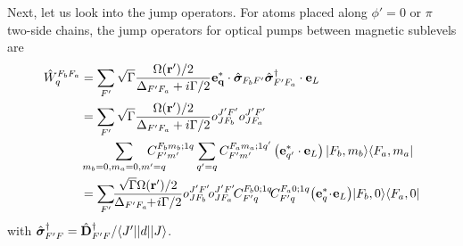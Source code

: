Next, let us look into the jump operators.
For atoms placed along $ \phi'=0 $ or $ \pi $ two-side chains, the jump operators for optical pumps between magnetic sublevels are \cite{Deutsch2010a}
\begin{align} \label{Eq::JumpOperators}
\hat{W}_q^{F_bF_a} &= \sum_{F'} \sqrt{\Gamma}\frac{\Omega(\mathbf{r}')/2}{ \Delta_{F'F_a} + i\Gamma/2} \mathbf{e^*_q} \cdot \hat{\boldsymbol{\sigma}}_{F_bF'} \hat{\boldsymbol{\sigma}}_{F'F_a}^{\dagger} \cdot \mathbf{e}_L \\
&= \sum_{F'} \sqrt{\Gamma}\frac{\Omega(\mathbf{r}')/2}{ \Delta_{F'F_a} + i\Gamma/2} o^{J'F'}_{JF_b} o^{J'F'}_{JF_a}\nonumber\\
& \sum_{m_b=0,m_a=0,m'=q}\!\!\!\!\!\!\!\!\!\! C^{F_b m_b;1q}_{F' m'} \sum_{q'=q}C^{F_a m_a;1q'}_{F' m'} \left(\mathbf{e}^*_{q'} \cdot\mathbf{e}_L \right) \op{F_b,m_b}{F_a,m_a}\\
&= \sum_{F'} \!\!\frac{\sqrt{\Gamma}\Omega(\mathbf{r}')/2}{ \Delta_{F'F_a} \!\!+\! i\Gamma/2} o^{J'F'}_{JF_b}\! o^{J'F'}_{JF_a}\!  C^{F_b 0;1q}_{F' q}\! C^{F_a 0;1q}_{F' q}\! \left(\mathbf{e}^*_{q}\! \cdot\! \mathbf{e}_L \right)\! \op{F_b,0}{F_a,0}
\end{align}
with $ \hat{\boldsymbol{\sigma}}_{F'F}^{\dagger}=\hat{\mathbf{D}}_{F'F}^{\dagger}/\langle{J'}\rvert| d |\lvert{J}\rangle $.



